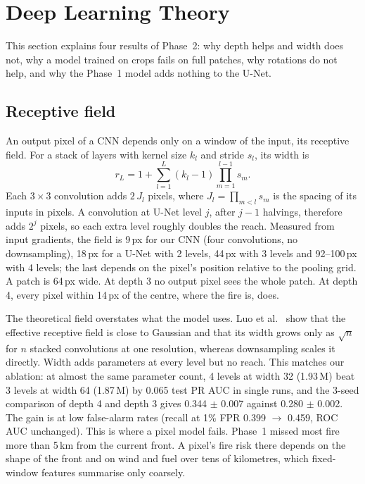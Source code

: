 
\section{Deep Learning Theory}
\label{sec:dl_theory}

This section explains four results of Phase~2: why depth helps and width does not, why a model trained on
crops fails on full patches, why rotations do not help, and why the Phase~1 model adds nothing to the
U-Net.

\subsection{Receptive field}
\label{sec:dl_theory_rf}

An output pixel of a CNN depends only on a window of the input, its receptive field. For a stack of
layers with kernel size $k_l$ and stride $s_l$, its width is
\begin{equation}
r_L = 1 + \sum_{l=1}^{L} (k_l - 1) \prod_{m=1}^{l-1} s_m .
\label{eq:rf}
\end{equation}
Each $3\times3$ convolution adds $2\,J_l$ pixels, where $J_l = \prod_{m<l} s_m$ is the spacing of its
inputs in pixels. A convolution at U-Net level $j$, after $j-1$ halvings, therefore adds $2^{j}$ pixels, so
each extra level roughly doubles the reach. Measured from input gradients, the field is 9\,px for our
CNN (four convolutions, no downsampling), 18\,px for a U-Net with 2 levels, 44\,px with 3 levels and
92--100\,px with 4 levels; the last depends on the pixel's position relative to the pooling grid. A
patch is 64\,px wide. At depth 3 no output pixel sees the whole patch. At depth 4, every pixel within
14\,px of the centre, where the fire is, does.

The theoretical field overstates what the model uses. Luo et al.~\cite{luo2016} show that the effective
receptive field is close to Gaussian and that its width grows only as $\sqrt{n}$ for $n$ stacked
convolutions at one resolution, whereas downsampling scales it directly. Width adds parameters at every
level but no reach. This matches our ablation: at almost the same parameter count, 4 levels at width 32
(1.93\,M) beat 3 levels at width 64 (1.87\,M) by 0.065 test PR AUC in single runs, and the 3-seed
comparison of depth 4 and depth 3 gives 0.344 $\pm$ 0.007 against 0.280 $\pm$ 0.002. The gain is at
low false-alarm rates (recall at 1\% FPR 0.399 $\to$ 0.459, ROC AUC unchanged). This is where a pixel
model fails. Phase~1 missed most fire more than 5\,km from the current front. A pixel's fire
risk there depends on the shape of the front and on wind and fuel over tens of kilometres, which
fixed-window features summarise only coarsely.


